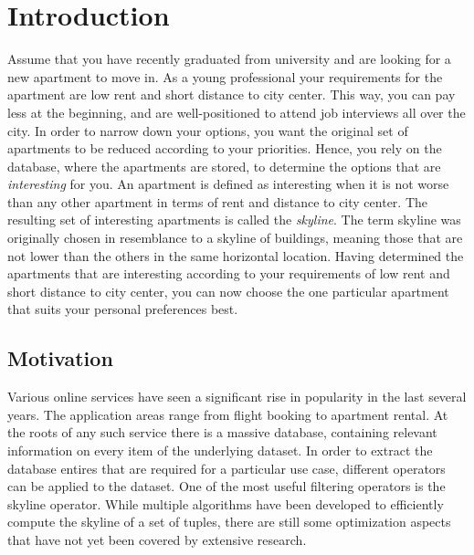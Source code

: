 \chapter{Introduction} \label{chapter:Introduction}
Assume that you have recently graduated from university and are looking for a new apartment to move in. As a young professional your requirements for the apartment are low rent and short distance to city center. This way, you can pay less at the beginning, and are well-positioned to attend job interviews all over the city. In order to narrow down your options, you want the original set of apartments to be reduced according to your priorities. Hence, you rely on the database, where the apartments are stored, to determine the options that are \textit{interesting} for you. An apartment is defined as interesting when it is not worse than any other apartment in terms of rent and distance to city center. The resulting set of interesting apartments is called the \textit{skyline}. The term skyline was originally chosen in resemblance to a skyline of buildings, meaning those that are not lower than the others in the same horizontal location. %
Having determined the apartments that are interesting according to your requirements of low rent and short distance to city center, you can now choose the one particular apartment that suits your personal preferences best. 

 
\section{Motivation}
Various online services have seen a significant rise in popularity in the last several years. The application areas range from flight booking to apartment rental. At the roots of any such service there is a massive database, containing relevant information on every item of the underlying dataset. In order to extract the database entires that are required for a particular use case, different operators can be applied to the dataset. One of the most useful filtering operators is the skyline operator. While multiple algorithms have been developed to efficiently compute the skyline of a set of tuples, there are still some optimization aspects that have not yet been covered by extensive research. 

